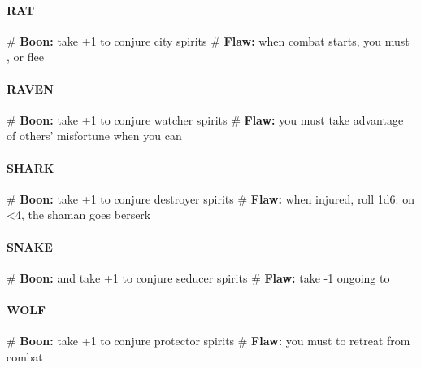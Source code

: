 \paragraph{RAT}
    \begin{easylist}
        # \textbf{Boon:} take +1 to conjure city spirits
        # \textbf{Flaw:} when combat starts, you must , or flee
    \end{easylist}

\paragraph{RAVEN}
    \begin{easylist}
        # \textbf{Boon:} take +1 to conjure watcher spirits
        # \textbf{Flaw:} you must take advantage of others’ misfortune when you can
    \end{easylist}

\paragraph{SHARK}
    \begin{easylist}
        # \textbf{Boon:} take +1 to conjure destroyer spirits
        # \textbf{Flaw:} when injured, roll 1d6: on <4, the shaman goes berserk
    \end{easylist}

\paragraph{SNAKE}
    \begin{easylist}
        # \textbf{Boon:} and take +1 to conjure seducer spirits
        # \textbf{Flaw:} take -1 ongoing to 
    \end{easylist}

\paragraph{WOLF}
    \begin{easylist}
        # \textbf{Boon:} take +1 to conjure protector spirits
        # \textbf{Flaw:} you must  to retreat from combat
    \end{easylist}
